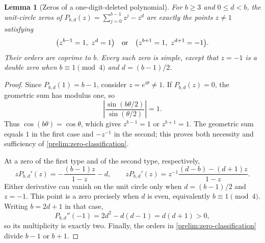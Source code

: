 \documentclass[11pt,a4paper]{article}
\theoremstyle{paperplain}
\newtheorem{lemma}[theorem]{Lemma}
\numberwithin{equation}{section}
\begin{document}
\begin{lemma}[Zeros of a one-digit-deleted polynomial]\label{prelim:zeros}
For $b\geqslant3$ and $0\leqslant d<b$, the unit-circle zeros of
$P_{b,d}(z)=\sum_{j=0}^{b-1}z^j-z^d$ are exactly the points $z\ne1$
satisfying
\begin{equation}\label{prelim:zero-classification}
 \bigl(z^{b-1}=1,\ z^d=1\bigr)
 \quad\hbox{or}\quad
 \bigl(z^{b+1}=1,\ z^{d+1}=-1\bigr).
\end{equation}
Their orders are coprime to $b$. Every such zero is simple, except that
$z=-1$ is a double zero when $b\equiv1\pmod4$ and $d=(b-1)/2$.
\end{lemma}
\begin{proof}
Since $P_{b,d}(1)=b-1$, consider $z=e^{i\theta}\ne1$.
If $P_{b,d}(z)=0$, the geometric sum has modulus one, so
\[
 \left|\frac{\sin(b\theta/2)}{\sin(\theta/2)}\right|=1.
\]
Thus $\cos(b\theta)=\cos\theta$, which gives $z^{b-1}=1$ or
$z^{b+1}=1$. The geometric sum equals $1$ in the first case and
$-z^{-1}$ in the second; this proves both necessity and sufficiency
of \eqref{prelim:zero-classification}.

At a zero of the first type and of the second type, respectively,
\[
 zP_{b,d}'(z)=-\frac{(b-1)z}{1-z}-d,\qquad
 zP_{b,d}'(z)=z^{-1}\frac{(d-b)-(d+1)z}{1-z}.
\]
Either derivative can vanish on the unit circle only when
$d=(b-1)/2$ and $z=-1$. This point is a zero precisely when $d$ is
even, equivalently $b\equiv1\pmod4$. Writing $b=2d+1$ in that case,
\[
 P_{b,d}''(-1)=2d^2-d(d-1)=d(d+1)>0,
\]
so its multiplicity is exactly two. Finally, the orders in
\eqref{prelim:zero-classification} divide $b-1$ or $b+1$.
\end{proof}
\end{document}
